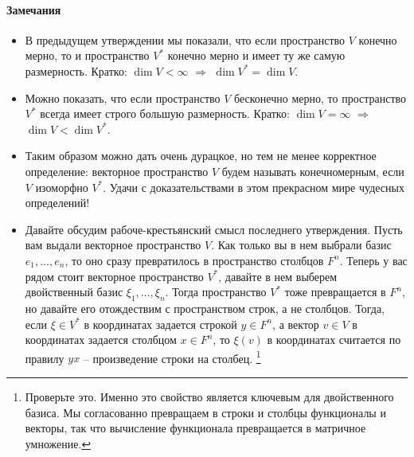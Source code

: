 \paragraph{Замечания}

\begin{itemize}
\item В предыдущем утверждении мы показали, что если пространство $V$ конечно мерно, то и пространство $V^*$ конечно мерно и имеет ту же самую размерность.
Кратко:  $\dim V <\infty$ $\Rightarrow$ $\dim V^* = \dim V$.

\item Можно показать, что если пространство $V$ бесконечно мерно, то пространство $V^*$ всегда имеет строго большую размерность.
Кратко: $\dim V = \infty$ $\Rightarrow$ $\dim V < \dim V^*$.

\item Таким образом можно дать очень дурацкое, но тем не менее корректное определение: векторное пространство $V$ будем называть конечномерным, если $V$ изоморфно $V^*$.
Удачи с доказательствами в этом прекрасном мире чудесных определений!

\item Давайте обсудим рабоче-крестьянский смысл последнего утверждения.
Пусть вам выдали векторное пространство $V$.
Как только вы в нем выбрали базис $e_1,\ldots,e_n$, то оно сразу превратилось в пространство столбцов $F^n$.
Теперь у вас рядом стоит векторное пространство $V^*$, давайте в нем выберем двойственный базис $\xi_1,\ldots,\xi_n$.
Тогда пространство $V^*$ тоже превращается в $F^n$, но давайте его отождествим с пространством строк, а не столбцов.
Тогда, если $\xi \in V^*$ в координатах задается строкой $y\in F^n$, а вектор $v\in V$ в координатах задается столбцом $x\in F^n$, то $\xi(v)$ в координатах считается по правилу $yx$ -- произведение строки на столбец.%
\footnote{Проверьте это.
Именно это свойство является ключевым для двойственного базиса.
Мы согласованно превращаем в строки и столбцы функционалы и векторы, так что вычисление функционала превращается в матричное умножение.}
\end{itemize}
